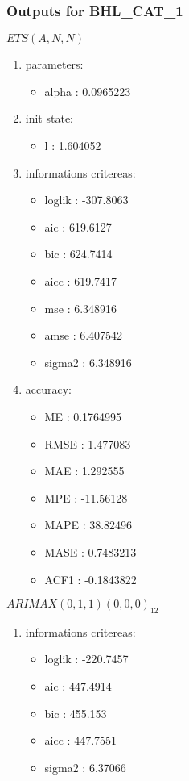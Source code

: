 \documentclass[10pt,a4paper]{article}\usepackage[]{graphicx}\usepackage[]{color}
\newcommand{\AaA}{\_}
\begin{document}
\subsubsection{Outputs for BHL\AaA CAT\AaA 1}
\begin{multicols}{2}


$ ETS(A,N,N) $
\begin{enumerate}
\item parameters:
\begin{itemize}
\item  alpha :  0.0965223 
\end{itemize}
\item init state:
\begin{itemize}
\item  l :  1.604052 
\end{itemize}
\item informations critereas:
\begin{itemize}
\item  loglik :  -307.8063 
\item  aic :  619.6127 
\item  bic :  624.7414 
\item  aicc :  619.7417 
\item  mse :  6.348916 
\item  amse :  6.407542 
\item  sigma2 :  6.348916 
\end{itemize}
\item accuracy:
\begin{itemize}
\item  ME :  0.1764995 
\item  RMSE :  1.477083 
\item  MAE :  1.292555 
\item  MPE :  -11.56128 
\item  MAPE :  38.82496 
\item  MASE :  0.7483213 
\item  ACF1 :  -0.1843822 
\end{itemize}
\end{enumerate}

\columnbreak


 $ARIMAX(0,1,1)(0,0,0)_{12}$ 
\begin{enumerate}
\item informations critereas:
\begin{itemize}
\item  loglik :  -220.7457 
\item  aic :  447.4914 
\item  bic :  455.153 
\item  aicc :  447.7551 
\item  sigma2 :  6.37066 
\end{itemize}


\end{enumerate}
\end{multicols}
\end{document}
